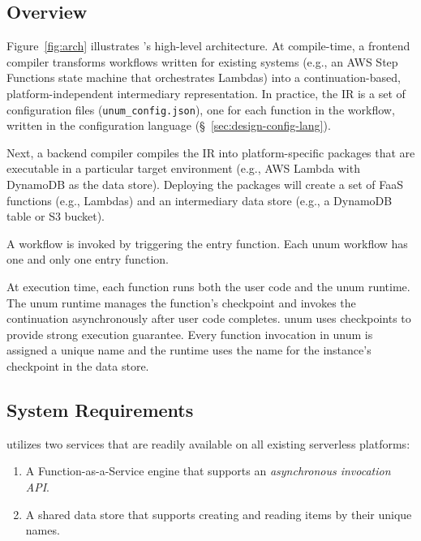 \subsection{Overview}\label{sec:design-overview}

Figure~\ref{fig:arch} illustrates \name{}'s high-level architecture. At
compile-time, a frontend compiler transforms workflows written for existing
systems (e.g., an AWS Step Functions state machine that orchestrates Lambdas)
into a continuation-based, platform-independent intermediary representation.
In practice, the IR is a set of configuration files
(\texttt{unum\_config.json}), one for each function in the workflow, written
in the \name{} configuration language (\S~\ref{sec:design-config-lang}).

Next, a backend compiler compiles the IR into platform-specific packages that
are executable in a particular target environment (e.g., AWS Lambda with
DynamoDB as the data store). Deploying the packages will create a set of FaaS
functions (e.g., Lambdas) and an intermediary data store (e.g., a DynamoDB
table or S3 bucket).

A workflow is invoked by triggering the entry function. Each unum workflow has
one and only one entry function.

At execution time, each function runs both the user code and the unum runtime.
The unum runtime manages the function's checkpoint and invokes the
continuation asynchronously after user code completes. unum uses checkpoints
to provide strong execution guarantee. Every function invocation in unum is
assigned a unique name and the runtime uses the name for the instance's
checkpoint in the data store.

\subsection{System Requirements}\label{sec:design-req}

\name{} utilizes two services that are readily available on all existing
serverless platforms:

\begin{enumerate}

	\item A Function-as-a-Service engine that supports an
	\emph{asynchronous invocation API}.

	\item A shared data store that supports creating and reading items by
	 their unique names.

\end{enumerate}

